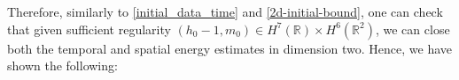 \documentclass[reqno,11pt]{amsart}
\newcommand{\norm}[2]{\Vert #1 \Vert_{#2}}
\DeclareMathOperator{\curl}{curl}
\theoremstyle{plain}
\theoremstyle{definition}
\numberwithin{equation}{section}
\begin{document}
Therefore, similarly to \eqref{initial_data_time} and \eqref{2d-initial-bound}, one can check that given sufficient regularity $(h_0-1,m_0)\in H^7(\mathbb{R})\times H^6(\mathbb{R}^2)$, we can close both the temporal and spatial energy estimates in dimension two. Hence, we have shown the following: 
\end{document}

